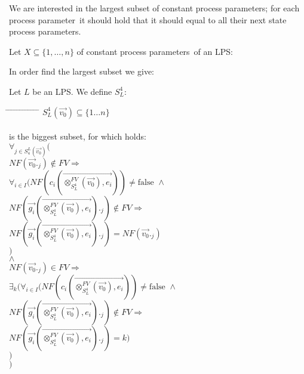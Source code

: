 \index{}\documentclass[a4paper,10pt]{article}
\theoremstyle{plain}
\theoremstyle{definition}
\newcommand{\ovr}{\overrightarrow}
\newcommand{\pp}{process parameter}
\newcommand{\pps}{process parameters}
\newcommand{\tab}{\hspace*{5.mm} \= \hspace*{5.mm} \= \hspace*{5.mm} \= \hspace*{5.mm} \= \hspace*{5.mm} \= \hspace*{5.mm}  \= \hspace*{5.mm}  \= \hspace*{5.mm}  \= \hspace*{5.mm} \= \hspace*{5.mm} \= \hspace*{5.mm}  \= \hspace*{5.mm}  \= \hspace*{5.mm}\kill}
\begin{document}
We are interested in the largest subset of constant \pps ; for each \pp\ it should hold that it should equal to all their next state \pps.

Let $X \subseteq \lbrace 1, \ldots, n \rbrace$ of constant \pps\ of an LPS:


\newcommand{\z}{(\ovr{\otimes_{S_L^4}^{FV}(\ovr{v_0}),e_i})}

\noindent In order find the largest subset we give: %
\begin{defn} \label{def:sug4} Let $L$ be an LPS. We define $S_L^4$:
\begin{tabbing}
\tab
$ S_L^4(\ovr{v_0}) \subseteq \lbrace 1 \ldots n  \rbrace $ \\ \\
is the biggest subset, for which holds:\\
\> $\forall_{j \in S^L_4(\ovr{v_0})}($\\
\> \>$NF(\ovr{v_0}._j) \not\in FV \Rightarrow $\\
\> \>$\forall_{i \in I} (NF(c_i\z) \neq \text{false } \wedge$ \\
\> \>$NF(\ovr{g_i}\z._j) \not\in FV \Rightarrow$\\
\> \> \> $NF(\ovr{g_i}\z._j)= NF(\ovr{v_0}._j)$\\
 \> \> $)$\\
\> $\land$\\
\> \> $NF(\ovr{v_0}._j) \in FV \Rightarrow$ \\
\> \>$ \exists_k(\forall_{i \in I} (NF(c_i\z) \neq \text{false } \wedge $\\
\> \>$ NF(\ovr{g_i}\z._j) \not\in FV \Rightarrow $ \\
\> \> \> $ NF(\ovr{g_i}\z._j)= k)$\\
\> \> $)$\\
\> $)$\\
\end{tabbing}
\end{defn}
\end{document}
